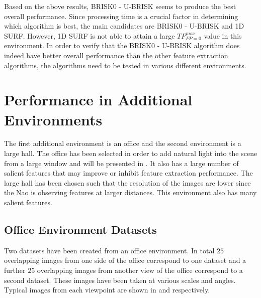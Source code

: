 Based on the above results, BRISK0 - U-BRISK seems to produce the best overall performance. Since processing time is a crucial factor in determining which algorithm is best, the main candidates are BRISK0 - U-BRISK and 1D SURF. However, 1D SURF is not able to attain a large $TP_{FP=0}^{max}$ value in this environment. In order to verify that the BRISK0 - U-BRISK algorithm does indeed have better overall performance than the other feature extraction algorithms, the algorithms need to be tested in various different environments.\\ 


\section{Performance in Additional Environments}
\label{sec:additionalDataset}
The first additional environment is an office and the second environment is a large hall. The office has been selected in order to add natural light into the scene from a large window and will be presented in . It also has a large number of salient features that may improve or inhibit feature extraction performance. The large hall has been chosen such that the resolution of the images are lower since the Nao is observing features at larger distances. This environment also has many salient features. \\

\subsection{Office Environment Datasets}
\label{sec:office}
Two datasets have been created from an office environment. In total $25$ overlapping images from one side of the office correspond to one dataset and a further $25$ overlapping images from another view of the office correspond to a second dataset. These images have been taken at various scales and angles. Typical images from each viewpoint are shown in  and  respectively.\\


